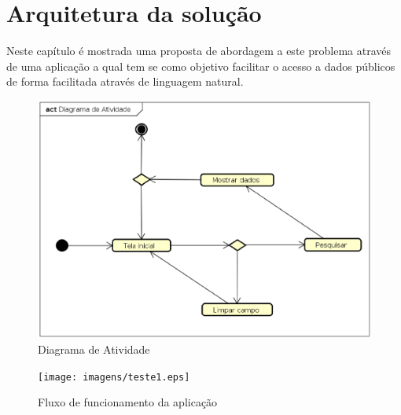 \section{Arquitetura da solução}
Neste capítulo é mostrada uma proposta de abordagem a este problema através de uma aplicação a qual tem  se como objetivo facilitar o acesso a dados públicos de forma facilitada através de linguagem natural.

\begin{figure}[!htb]
        \caption{\label{diagrama1}Diagrama de Atividade}
        \begin{center}
                \includegraphics[width=\textwidth]{imagens/teste.eps}
        \end{center}
\end{figure}


\begin{figure}[!htb]
        \caption{\label{diagrama1}Fluxo de funcionamento da aplicação}
        \begin{center}
                \texttt{[image: imagens/teste1.eps]}
        \end{center}
\end{figure}
